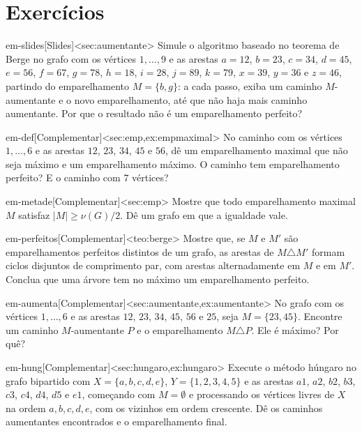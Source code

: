 \section{Exercícios}
\excurso
\begin{exercicio}{em-slides}[Slides]<sec:aumentante>
Simule o algoritmo baseado no teorema de Berge no grafo com os vértices $1,\dots,9$ e as arestas $a=12$, $b=23$, $c=34$, $d=45$, $e=56$, $f=67$, $g=78$, $h=18$, $i=28$, $j=89$, $k=79$, $x=39$, $y=36$ e $z=46$, partindo do emparelhamento $M=\{b,g\}$: a cada passo, exiba um caminho $M$-aumentante e o novo emparelhamento, até que não haja mais caminho aumentante. Por que o resultado não é um emparelhamento perfeito?
\end{exercicio}

\excompl
\begin{exercicio}{em-def}[Complementar]<sec:emp,ex:empmaximal>
No caminho com os vértices $1,\dots,6$ e as arestas $12$, $23$, $34$, $45$ e $56$, dê um emparelhamento maximal que não seja máximo e um emparelhamento máximo. O caminho tem emparelhamento perfeito? E o caminho com 7 vértices?
\end{exercicio}
\begin{exercicio}{em-metade}[Complementar]<sec:emp>
Mostre que todo emparelhamento maximal $M$ satisfaz $|M|\ge\nu(G)/2$. Dê um grafo em que a igualdade vale.
\end{exercicio}
\begin{exercicio}{em-perfeitos}[Complementar]<teo:berge>
Mostre que, se $M$ e $M'$ são emparelhamentos perfeitos distintos de um grafo, as arestas de $M\triangle M'$ formam ciclos disjuntos de comprimento par, com arestas alternadamente em $M$ e em $M'$. Conclua que uma árvore tem no máximo um emparelhamento perfeito.
\end{exercicio}
\begin{exercicio}{em-aumenta}[Complementar]<sec:aumentante,ex:aumentante>
No grafo com os vértices $1,\dots,6$ e as arestas $12$, $23$, $34$, $45$, $56$ e $25$, seja $M=\{23,45\}$. Encontre um caminho $M$-aumentante $P$ e o emparelhamento $M\triangle P$. Ele é máximo? Por quê?
\end{exercicio}
\begin{exercicio}{em-hung}[Complementar]<sec:hungaro,ex:hungaro>
Execute o método húngaro no grafo bipartido com $X=\{a,b,c,d,e\}$, $Y=\{1,2,3,4,5\}$ e as arestas $a1$, $a2$, $b2$, $b3$, $c3$, $c4$, $d4$, $d5$ e $e1$, começando com $M=\emptyset$ e processando os vértices livres de $X$ na ordem $a,b,c,d,e$, com os vizinhos em ordem crescente. Dê os caminhos aumentantes encontrados e o emparelhamento final.
\end{exercicio}
